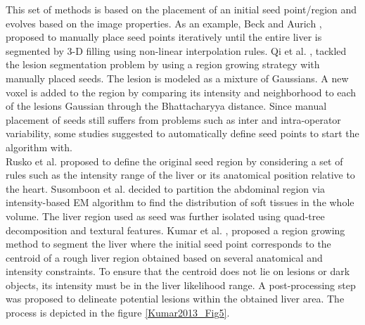 This set of methods
is based on the placement of an initial seed point/region and evolves
based on the image properties. As an example, Beck and Aurich \cite{Beck2007}, proposed to manually place seed points iteratively
until the entire liver is segmented by 3-D filling using non-linear
interpolation rules.
Qi et al. \cite{Qi2008}, tackled the lesion segmentation problem by using a region
growing strategy with manually placed seeds. The lesion is modeled as a
mixture of Gaussians. A new voxel is added to the region by comparing its
intensity and neighborhood to each of the lesions Gaussian through the
Bhattacharyya distance.
Since manual placement of seeds still suffers from problems
such as inter and intra-operator variability, some studies suggested to
automatically define seed points to start the algorithm with.\\
Rusko et al. \cite{Rusko2007, Rusko2009}
proposed to define the original seed region by considering a set of rules
such as the intensity range of the liver or its
anatomical position relative to the heart.
Susomboon et al. \cite{Susomboon2007} decided to partition the abdominal region via intensity-based
EM algorithm to find the distribution of soft tissues in the whole
volume. The liver region used as seed was further isolated using
quad-tree decomposition and textural features.
Kumar et al. \cite{Kumar2013}, proposed a region growing method to segment the liver where the
initial seed point corresponds to the centroid of a rough liver region
obtained based on several anatomical and intensity constraints. To
ensure that the centroid does not lie on lesions or dark objects, its
intensity must be in the liver likelihood range. A post-processing step was 
proposed to delineate potential lesions within the obtained liver area. The process is depicted
in the figure \ref{Kumar2013_Fig5}.

